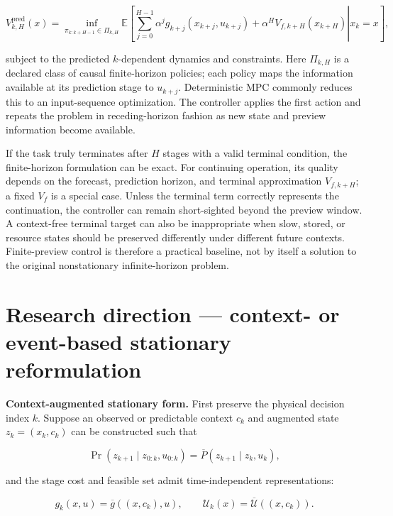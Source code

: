 \documentclass[a4paper]{article}
\begin{document}
\begin{equation}
  V_{k,H}^{\mathrm{pred}}(x)
  =
  \inf_{\pi_{k:k+H-1}\in\Pi_{k,H}}
  \mathbb E
  \!\left[
  \left.
  \sum_{j=0}^{H-1}
  \alpha^j
  g_{k+j}(x_{k+j},u_{k+j})
  +
  \alpha^H V_{f,k+H}(x_{k+H})
  \right|
  x_k=x
  \right],
\end{equation}

subject to the predicted $k$-dependent dynamics and constraints. Here
$\Pi_{k,H}$ is a declared class of causal finite-horizon policies; each policy
maps the information available at its prediction stage to $u_{k+j}$.
Deterministic MPC commonly reduces this to an input-sequence optimization. The
controller applies the first action and repeats the problem in
receding-horizon fashion as new state and preview information become
available.

If the task truly terminates after $H$ stages with a valid terminal condition,
the finite-horizon formulation can be exact. For continuing operation, its
quality depends on the forecast, prediction horizon, and terminal
approximation $V_{f,k+H}$; a fixed $V_f$ is a special case. Unless the
terminal term correctly represents the continuation, the controller can remain
short-sighted beyond the preview window. A context-free terminal target can
also be inappropriate when slow, stored, or resource states should be
preserved differently under different future contexts. Finite-preview control
is therefore a practical baseline, not by itself a solution to the original
nonstationary infinite-horizon problem.

\section{Research direction — context- or event-based stationary reformulation}

\textbf{Context-augmented stationary form.} First preserve the physical
decision index $k$. Suppose an observed or predictable context $c_k$ and
augmented state $z_k=(x_k,c_k)$ can be constructed such that

\begin{equation}
  \Pr
  \!\left(
  z_{k+1}\mid z_{0:k},u_{0:k}
  \right)
  =
  \overline P
  \!\left(
  z_{k+1}\mid z_k,u_k
  \right),
\end{equation}

and the stage cost and feasible set admit time-independent representations:

\begin{equation}
  g_k(x,u)
  =
  \overline g\!\left((x,c_k),u\right),
  \qquad
  \mathcal U_k(x)
  =
  \overline{\mathcal U}\!\left((x,c_k)\right).
\end{equation}
\end{document}
